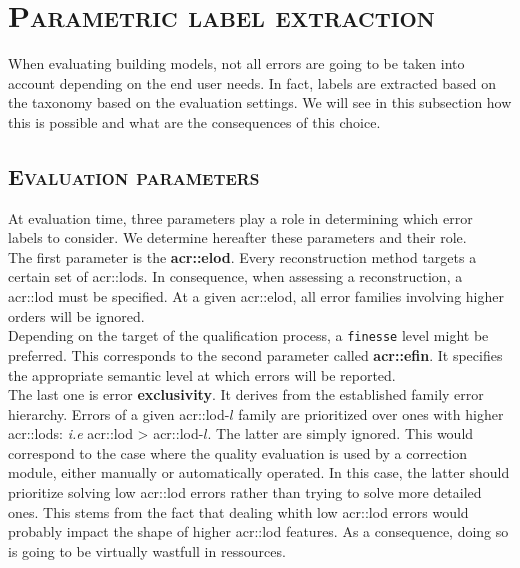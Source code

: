 \section{\textsc{Parametric label extraction}}
    \label{sec::semantic_evaluation::label_extraction}
    When evaluating building models, not all errors are going to be taken into account depending on the end user needs.
    In fact, labels are extracted based on the taxonomy based on the evaluation settings.
    We will see in this subsection how this is possible and what are the consequences of this choice.

    \subsection{\textsc{Evaluation parameters}}
        At evaluation time, three parameters play a role in determining which error labels to consider.
        We determine hereafter these parameters and their role.\\

        The first parameter is the \textbf{\gls{acr::elod}}.
        Every reconstruction method targets a certain set of \glspl{acr::lod}.
        In consequence, when assessing a reconstruction, a \gls{acr::lod} must be specified.
        At a given \gls{acr::elod}, all error families involving higher orders will be ignored.\\
        Depending on the target of the qualification process, a \texttt{finesse} level might be preferred.
        This corresponds to the second parameter called \textbf{\gls{acr::efin}}.
        It specifies the appropriate semantic level at which errors will be reported.\\
        The last one is error \textbf{exclusivity}.
        It derives from the established family error hierarchy.
        Errors of a given \gls{acr::lod}-$l$ family are prioritized over ones with higher \glspl{acr::lod}: \textit{i.e} \gls{acr::lod} > \gls{acr::lod}-$l$.
        The latter are simply ignored.
        This would correspond to the case where the quality evaluation is used by a correction module, either manually or automatically operated.
        In this case, the latter should prioritize solving low \gls{acr::lod} errors rather than trying to solve more detailed ones.
        This stems from the fact that dealing whith low \gls{acr::lod} errors would probably impact the shape of higher \gls{acr::lod} features.
        As a consequence, doing so is going to be virtually wastfull in ressources.

